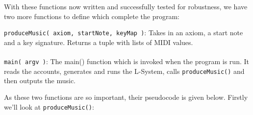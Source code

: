 \noindent With these functions now written and successfully tested for robustness, we have two more functions to define which complete the program:

\begin{singlespace}
\begin{formality}
\texttt{produceMusic( axiom, startNote, keyMap )}: Takes in an axiom, a start note and a key signature. Returns a tuple with lists of MIDI values.\\\\
\texttt{main( argv )}: The main() function which is invoked when the program is run. It reads the accounts, generates and runs the L-System, calls \texttt{produceMusic()} and then outputs the music.
\end{formality}
\end{singlespace}

As these two functions are so important, their pseudocode is given below. Firstly we'll look at \texttt{produceMusic()}:

